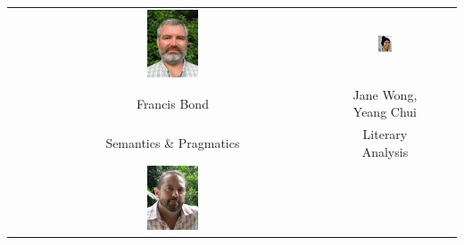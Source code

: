 \documentclass[a4paper,landscape,headrule,footrule,xetex,25pt]{foils}
\begin{document}
\newcommand{\picwidth}{0.16\textwidth}
\begin{center}
  \begin{tabular}{cccc}
    \includegraphics[width=\picwidth]{pics/francis} & 
    \includegraphics[width=\picwidth]{pics/jane} \\
    Francis Bond &
    Jane Wong, Yeang Chui \\
    Semantics \& Pragmatics & Literary Analysis \\
    \includegraphics[width=\picwidth]{pics/brian} & 

\end{tabular}
\end{center}
\end{document}
